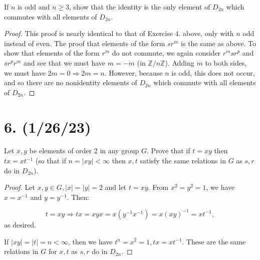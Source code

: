 \documentclass{article}
\begin{document}
If $n$ is odd and $n \geq 3$, show that the identity is the only element of $D_{2n}$ which commutes with all elements of $D_{2n}$.

\begin{proof}
    This proof is nearly identical to that of Exercise 4. above, only with $n$ odd instead of even. The proof that elements of the form $sr^m$ is the same as above. To show that elements of the form $r^m$ do not commute, we again consider $r^m sr^p$ and $sr^p r^m$ and see that we must have $m = -m$ (in $\mathbb{Z}/n\mathbb{Z}$). Adding $m$ to both sides, we must have $2m = 0 \Rightarrow 2m = n$. However, because $n$ is odd, this does not occur, and so there are no nonidentity elements of $D_{2n}$ which commute with all elements of $D_{2n}$.
\end{proof}

\section*{6. (1/26/23)}

Let $x, y$ be elements of order 2 in any group $G$. Prove that if $t = xy$ then $tx = xt^{-1}$ (so that if $n = |xy| < \infty$ then $x, t$ satisfy the same relations in $G$ as $s, r$ do in $D_{2n}$).

\begin{proof}
    Let $x, y \in G, |x| = |y| = 2$ and let $t = xy$. From $x^2 = y^2 = 1$, we have $x = x^{-1}$ and $y = y^{-1}$. Then:

    \begin{equation*}
        t = xy \Rightarrow tx = xyx = x(y^{-1} x^{-1}) = x(xy)^{-1} = xt^{-1},
    \end{equation*}
    as desired.

    If $|xy| = |t| = n < \infty$, then we have $t^n = x^2 = 1, tx = xt^{-1}$. These are the same relations in $G$ for $x, t$ as $s, r$ do in $D_{2n}$.
\end{proof}
\end{document}
